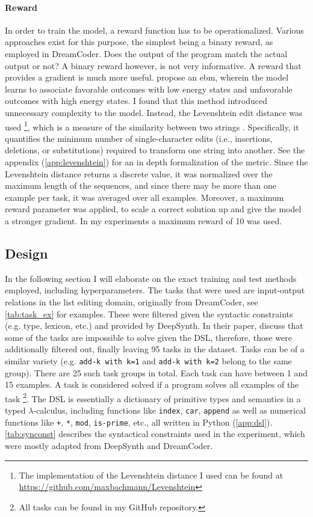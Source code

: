 \paragraph*{Reward} \label{sec:reward}
In order to train the model, a reward function has to be operationalized. Various approaches exist for this purpose, the simplest being a binary reward, as employed in DreamCoder. Does the output of the program match the actual output or not? A binary reward however, is not very informative. A reward that provides a gradient is much more useful. \citet{bengioGFlowNetFoundations2023} propose an \acrfull{ebm}, wherein the model learns to associate favorable outcomes with low energy states and unfavorable outcomes with high energy states. I found that this method introduced unnecessary complexity to the model. Instead, the Levenshtein edit distance was used \footnote{The implementation of the Levenshtein distance I used can be found at \url{https://github.com/maxbachmann/Levenshtein}}, which is a measure of the similarity between two strings \cite{Levenshtein}. Specifically, it quantifies the minimum number of single-character edits (i.e., insertions, deletions, or substitutions) required to transform one string into another. See the appendix (\autoref{app:levenshtein}) for an in depth formalization of the metric.
Since the Levenshtein distance returns a discrete value, it was normalized over the maximum length of the sequences, and since there may be more than one example per task, it was averaged over all examples. Moreover, a maximum reward parameter was applied, to scale a correct solution up and give the model a stronger gradient. In my experiments a maximum reward of 10 was used.


\subsection{Design} \label{subsec:design}
In the following section I will elaborate on the exact training and test methods employed, including hyperparameters.
The tasks that were used are input-output relations in the list editing domain, originally from DreamCoder, see \autoref{tab:task_ex} for examples. These were filtered given the syntactic constraints (e.g. type, lexicon, etc.) and provided by DeepSynth. 
In their paper, \citet{fijalkowScalingNeuralProgram2021} discuss that some of the tasks are impossible to solve given the DSL, therefore, those were additionally filtered out, finally leaving 95 tasks in the dataset. Tasks can be of a similar variety (e.g. \texttt{add-k with k=1} and \texttt{add-k with k=2} belong to the same group). There are 25 such task groups in total. Each task can have between 1 and 15 examples. A task is considered solved if a program solves all examples of the task \footnote{All tasks can be found in my GitHub repository.}.
The DSL is essentially a dictionary of primitive types and semantics in a typed $\lambda$-calculus, including functions like \texttt{index}, \texttt{car}, \texttt{append} as well as numerical functions like \texttt{+}, \texttt{*}, \texttt{mod}, \texttt{is-prime}, etc., all written in Python (\autoref{app:dsl}).
\autoref{tab:synconst} describes the syntactical constraints used in the experiment, which were mostly adapted from DeepSynth and DreamCoder.


